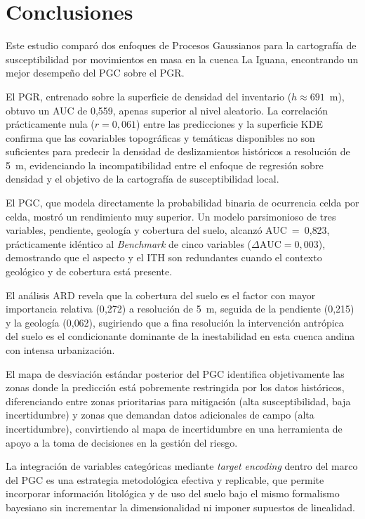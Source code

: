 \documentclass[12pt, a4paper]{article}
\begin{document}
\section{Conclusiones}
\label{sec:conclusiones}

Este estudio comparó dos enfoques de Procesos Gaussianos para la cartografía de susceptibilidad por movimientos en masa en la cuenca 
La Iguana, encontrando un mejor desempeño del PGC sobre el PGR.

El PGR, entrenado sobre la superficie de densidad del inventario ($h \approx 691$~m), obtuvo un AUC de 0{,}559, apenas superior
al nivel aleatorio. La correlación prácticamente nula ($r = 0{,}061$) entre las predicciones y la superficie KDE confirma que las
covariables topográficas y temáticas disponibles no son suficientes para predecir la densidad de deslizamientos históricos a
resolución de 5~m, evidenciando la incompatibilidad entre el enfoque de regresión sobre densidad y el objetivo de la cartografía
de susceptibilidad local.

El PGC, que modela directamente la probabilidad binaria de ocurrencia celda por celda, mostró un rendimiento muy superior. Un 
modelo parsimonioso de tres variables, pendiente, geología y cobertura del suelo, alcanzó AUC~=~0{,}823, prácticamente idéntico
al \textit{Benchmark} de cinco variables ($\Delta\text{AUC} = 0{,}003$), demostrando que el aspecto y el ITH son redundantes cuando
el contexto geológico y de cobertura está presente.

El análisis ARD revela que la cobertura del suelo es el factor con mayor importancia relativa (0{,}272) a resolución de 5~m,
seguida de la pendiente (0{,}215) y la geología (0{,}062), sugiriendo que a fina resolución la intervención antrópica del suelo
es el condicionante dominante de la inestabilidad en esta cuenca andina con intensa urbanización.

El mapa de desviación estándar posterior del PGC identifica objetivamente las zonas donde la predicción está pobremente restringida 
por los datos históricos, diferenciando entre zonas prioritarias para mitigación (alta susceptibilidad, baja incertidumbre) y zonas 
que demandan datos adicionales de campo (alta incertidumbre), convirtiendo al mapa de incertidumbre en una herramienta de apoyo a 
la toma de decisiones en la gestión del riesgo.

La integración de variables categóricas mediante \textit{target encoding} dentro del marco del PGC es una estrategia metodológica 
efectiva y replicable, que permite incorporar información litológica y de uso del suelo bajo el mismo formalismo bayesiano sin 
incrementar la dimensionalidad ni imponer supuestos de linealidad.
\end{document}
